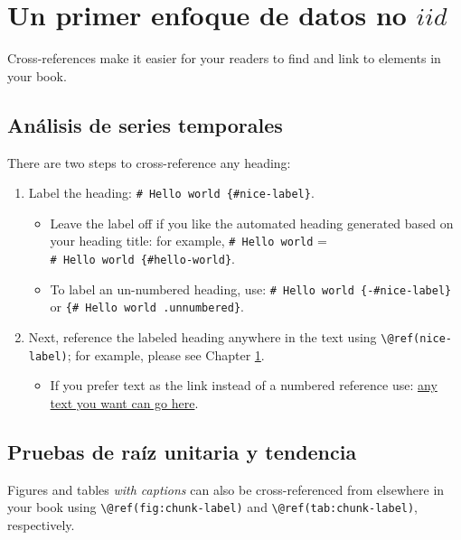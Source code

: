 \documentclass[
  20pt,
]{book}
\providecommand{\tightlist}{%
  \setlength{\itemsep}{0pt}\setlength{\parskip}{0pt}}
\theoremstyle{definition}
\theoremstyle{definition}
\theoremstyle{definition}
\theoremstyle{definition}
\theoremstyle{remark}
\begin{document}
\chapter{\texorpdfstring{Un primer enfoque de datos no \(iid\)}{Un primer enfoque de datos no iid}}\label{cross}

Cross-references make it easier for your readers to find and link to elements in your book.

\section{Análisis de series temporales}\label{anuxe1lisis-de-series-temporales}

There are two steps to cross-reference any heading:

\begin{enumerate}
\def\labelenumi{\arabic{enumi}.}
\tightlist
\item
  Label the heading: \texttt{\#\ Hello\ world\ \{\#nice-label\}}.

  \begin{itemize}
  \tightlist
  \item
    Leave the label off if you like the automated heading generated based on your heading title: for example, \texttt{\#\ Hello\ world} = \texttt{\#\ Hello\ world\ \{\#hello-world\}}.
  \item
    To label an un-numbered heading, use: \texttt{\#\ Hello\ world\ \{-\#nice-label\}} or \texttt{\{\#\ Hello\ world\ .unnumbered\}}.
  \end{itemize}
\item
  Next, reference the labeled heading anywhere in the text using \texttt{\textbackslash{}@ref(nice-label)}; for example, please see Chapter \ref{cross}.

  \begin{itemize}
  \tightlist
  \item
    If you prefer text as the link instead of a numbered reference use: \hyperref[cross]{any text you want can go here}.
  \end{itemize}
\end{enumerate}

\section{Pruebas de raíz unitaria y tendencia}\label{pruebas-de-rauxedz-unitaria-y-tendencia}

Figures and tables \emph{with captions} can also be cross-referenced from elsewhere in your book using \texttt{\textbackslash{}@ref(fig:chunk-label)} and \texttt{\textbackslash{}@ref(tab:chunk-label)}, respectively.
\end{document}
